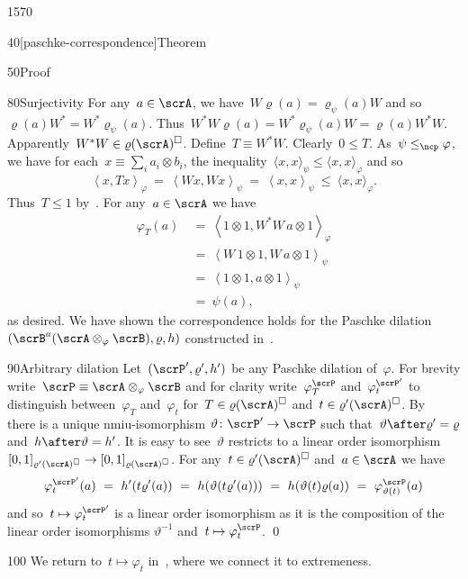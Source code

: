 \begin{parsec}{1570}
\begin{point}{40}[paschke-correspondence]{Theorem}
\begin{point}{50}{Proof}
\begin{point}{80}{Surjectivity}
For any~$a\in\scrA$, we have~$W \varrho(a) = \varrho_\psi(a) W$
and so~$\varrho(a) W^* = W^* \varrho_\psi(a)$.
Thus~$W^*W \varrho(a) = W^* \varrho_\psi(a) W = \varrho(a) W^*W$.
Apparently~$W^*W \in \varrho(\scrA)^\square$.
Define~$T \equiv W^*W$. Clearly~$0\leq T$.
As~$\psi \mathrel{\leq_\ncp} \varphi$,
    we have for each~$x \equiv \sum_i a_i \otimes b_i$,
    the inequality~$\langle x,x\rangle_\psi \leq \langle x,x\rangle_\varphi$
    and so
\begin{equation*}
    \left<x, Tx\right>_\varphi \ =\  \left<Wx,Wx\right>_\psi
    \ =\  \left<x,x\right>_\psi \ \leq\  \langle x,x \rangle_\varphi.
\end{equation*}
    Thus~$T \leq 1$ by~.
For any~$a\in \scrA$ we have
\begin{align*}
    \varphi_T(a) &\ =\  \left<1\otimes 1, W^*W\, a \otimes 1\right>_\varphi \\
    &  \ =\  \left<W\, 1\otimes 1, W\, a\otimes1\right>_\psi \\
    &  \ = \ \left<1\otimes1, a\otimes1\right>_\psi \\
    &  \ = \ \psi(a),
\end{align*}
    as desired.  We have shown the correspondence holds for
    the Paschke dilation~$(\scrB^a(\scrA \otimes_\varphi \scrB), \varrho, h)$
                constructed in~.
\end{point}
\begin{point}{90}{Arbitrary dilation}%
Let~$(\scrP', \varrho', h')$ be any Paschke dilation
    of~$\varphi$.
For brevity write~$\scrP \equiv \scrA \otimes_\varphi \scrB$
    and for clarity
    write~$\varphi_T^{\scrP}$
        and~$\varphi_t^{\scrP'}$
    to distinguish between~$\varphi_T$ and~$\varphi_t$
    for~$T \in \varrho(\scrA)^\square$ and~$t \in \varrho'(\scrA)^\square$.
By~
    there is a unique nmiu-isomorphism
    $\vartheta\colon \scrP' \to \scrP$
    such that~$\vartheta \after \varrho' = \varrho $
    and~$h \after \vartheta = h'$.
It is easy to see~$\vartheta$ restricts to a linear order isomorphism
    $[0,1]_{\varrho'(\scrA)^\square} \to [0,1]_{\varrho(\scrA)^\square}$.
For any~$t \in \varrho'(\scrA)^\square$ and~$a\in \scrA$ we have
\begin{equation*}
    \varphi_t^{\scrP'} (a)
        \ = \ h'(t \varrho'(a))
        \ = \ h(\vartheta(t \varrho'(a)))
        \ = \ h(\vartheta(t) \varrho(a))
        \ = \ \varphi_{\vartheta(t)}^{\scrP}(a)
\end{equation*}
and so~$t \mapsto \varphi_t^{\scrP'}$
    is a linear order isomorphism as it
    is the composition of the linear order isomorphisms
    $\vartheta^{-1}$ and~$t \mapsto \varphi_t^\scrP$. \qed
\end{point}
\begin{point}{100}%
We return to~$t \mapsto \varphi_t$
    in~,
    where we connect it to extremeness.
\end{point}
\end{point}
\end{point}
\end{parsec}
